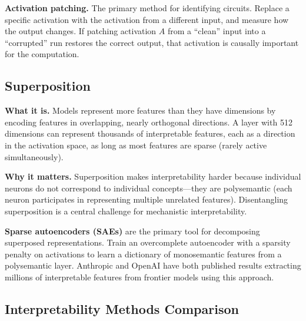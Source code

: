 \textbf{Activation patching.} The primary method for identifying circuits. Replace a specific activation with the activation from a different input, and measure how the output changes. If patching activation $A$ from a ``clean'' input into a ``corrupted'' run restores the correct output, that activation is causally important for the computation.

\subsection{Superposition}

\textbf{What it is.} Models represent more features than they have dimensions by encoding features in overlapping, nearly orthogonal directions. A layer with 512 dimensions can represent thousands of interpretable features, each as a direction in the activation space, as long as most features are sparse (rarely active simultaneously).

\textbf{Why it matters.} Superposition makes interpretability harder because individual neurons do not correspond to individual concepts---they are polysemantic (each neuron participates in representing multiple unrelated features). Disentangling superposition is a central challenge for mechanistic interpretability.

\textbf{Sparse autoencoders (SAEs)} are the primary tool for decomposing superposed representations. Train an overcomplete autoencoder with a sparsity penalty on activations to learn a dictionary of monosemantic features from a polysemantic layer. Anthropic and OpenAI have both published results extracting millions of interpretable features from frontier models using this approach.

\subsection{Interpretability Methods Comparison}

